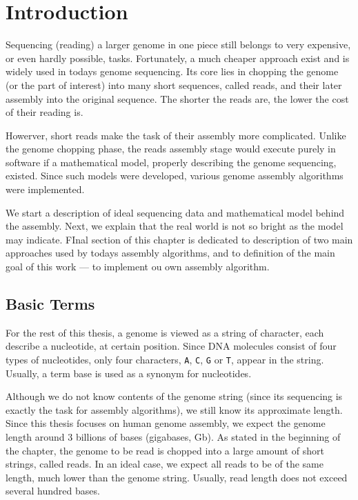 \chapter{Introduction}
\label{chap:introduction}

Sequencing (reading) a larger genome in one piece still belongs to very expensive, or even hardly possible, tasks. Fortunately, a much cheaper approach exist and is widely used in todays genome sequencing. Its core lies in chopping the genome (or the part of interest) into many short sequences, called reads, and their later assembly into the original sequence. The shorter the reads are, the lower the cost of their reading is. 

Howerver, short reads make the task of their assembly more complicated. Unlike the genome chopping phase, the reads assembly stage would execute purely in software if a mathematical model, properly describing the genome sequencing, existed. Since such models were developed, various genome assembly algorithms were implemented.

We start a description of ideal sequencing data and mathematical model behind the assembly. Next, we explain that the real world is not so bright as the model may indicate. FInal section of this chapter is dedicated to description of two main approaches used by todays assembly algorithms, and to definition of the main goal of this work --- to implement ou own assembly algorithm.

\section{Basic Terms}
\label{sec:basic-terms}

For the rest of this thesis, a genome is viewed as a string of character, each describe a nucleotide, at certain position. Since DNA molecules consist of four types of nucleotides, only four characters, \texttt{A}, \texttt{C}, \texttt{G} or \texttt{T}, appear in the string. Usually, a term base is used as a synonym for nucleotides.

Although we do not know contents of the genome string (since its sequencing is exactly the task for assembly algorithms), we still know its approximate length. Since this thesis focuses on human genome assembly, we expect the genome length around 3 billions of bases (gigabases, Gb). As stated in the beginning of the chapter, the genome to be read is chopped into a large amount of short strings, called reads. In an ideal case, we expect all reads to be of the same length, much lower than the genome string. Usually, read length does not exceed several hundred bases. 

